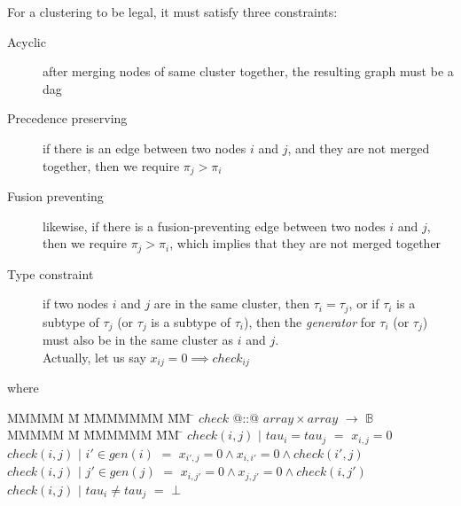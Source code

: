 For a clustering to be legal, it must satisfy three constraints:
\begin{description}
\item[Acyclic]
after merging nodes of same cluster together, the resulting graph must be a dag
\item[Precedence preserving]
if there is an edge between two nodes $i$ and $j$, and they are not merged together, then we require $\pi_j > \pi_i$
\item[Fusion preventing]
likewise, if there is a fusion-preventing edge between two nodes $i$ and $j$, then we require $\pi_j > \pi_i$, which implies that they are not merged together
\item[Type constraint]
if two nodes $i$ and $j$ are in the same cluster, then $\tau_i = \tau_j$, or if $\tau_i$ is a subtype of $\tau_j$ (or $\tau_j$ is a subtype of $\tau_i$), then the \emph{generator} for $\tau_i$ (or $\tau_j$) must also be in the same cluster as $i$ and $j$.
    \\
    \TODO Actually, let us say $x_{ij} = 0 \implies check_{ij}$

\end{description}
where
\begin{tabbing}
MMMMM      \= M \= MMMMMMM \= MM \= \kill
$check$ \> @::@  \> $array \times array$ \> $\to$ \> $\mathbb{B}$ \\
MMMMM      \= M \= MMMMMM \= MM \= \kill
$check(i, j)$     \> $|$ \> $tau_i = tau_j$ \> $=$ \> $x_{i,j} = 0$                        \\
$check(i, j)$     \> $|$ \> $i' \in gen(i) $ \> $=$ \> $x_{i',j} = 0 \wedge x_{i,i'} = 0 \wedge check(i', j)$                        \\
$check(i, j)$     \> $|$ \> $j' \in gen(j) $ \> $=$ \> $x_{i,j'} = 0 \wedge x_{j,j'} = 0 \wedge check(i, j')$                        \\
$check(i, j)$     \> $|$ \> $tau_i \not= tau_j$\> $=$ \> $\bot$
\end{tabbing}






